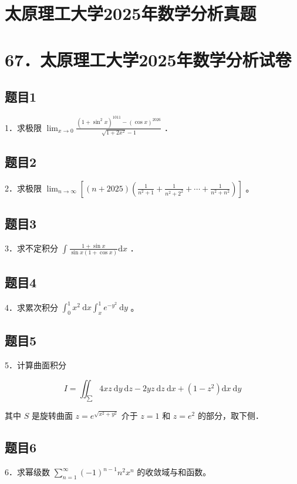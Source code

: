 \documentclass{article}
\begin{document}
\section*{太原理工大学2025年数学分析真题}
\section*{67．太原理工大学2025年数学分析试卷}

\subsection{题目1}
1．求极限 \(\lim _{x \rightarrow 0} \frac{\left(1+\sin ^{2} x\right)^{1011}-(\cos x)^{2026}}{\sqrt{1+2 x^{2}}-1}\) ．

\subsection{题目2}
2．求极限 \(\lim _{n \rightarrow \infty}\left[(n+2025)\left(\frac{1}{n^{2}+1}+\frac{1}{n^{2}+2^{2}}+\cdots+\frac{1}{n^{2}+n^{2}}\right)\right]\) 。

\subsection{题目3}
3．求不定积分 \(\int \frac{1+\sin x}{\sin x(1+\cos x)} \mathrm{d} x\) ．

\subsection{题目4}
4．求累次积分 \(\int_{0}^{1} x^{2} \mathrm{~d} x \int_{x}^{1} e^{-y^{2}} \mathrm{~d} y\) 。

\subsection{题目5}
5．计算曲面积分

\[
I=\iint_{\sum} 4 x z \mathrm{~d} y \mathrm{~d} z-2 y z \mathrm{~d} z \mathrm{~d} x+\left(1-z^{2}\right) \mathrm{d} x \mathrm{~d} y
\]

其中 \(S\) 是旋转曲面 \(z=e^{\sqrt{x^{2}+y^{2}}}\) 介于 \(z=1\) 和 \(z=e^{2}\) 的部分，取下侧．

\subsection{题目6}
6．求幂级数 \(\sum_{n=1}^{\infty}(-1)^{n-1} n^{2} x^{n}\) 的收敛域与和函数。
\end{document}
